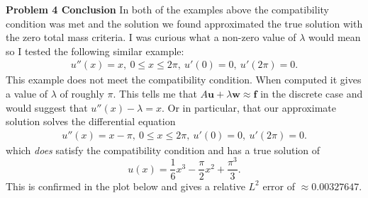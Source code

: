 \documentclass[12pt]{article}
\newcommand{\problem}[1]{\hspace{-4 ex} \large \textbf{Problem #1} }
\renewcommand{\vec}[1]{\boldsymbol{\mathbf{#1}}}
\begin{document}
\bigbreak
\problem{4 Conclusion} In both of the examples above the compatibility condition was met and the solution we found approximated the true solution with the zero total mass criteria. I was curious what a non-zero value of $\lambda$ would mean so I tested the following similar example:
\begin{align}
u''(x) = x, \ 0 \leq x \leq 2\pi, \ u'(0)=0, \ u'(2\pi)=0.
\end{align}
This example does not meet the compatibility condition. When computed it gives a value of $\lambda$ of roughly $\pi$.  This tells me that $A\vec{u} + \lambda \vec{w} \approx \vec{f}$ in the discrete case and would suggest that $u''(x) - \lambda = x$. Or in particular, that our approximate solution solves the differential equation
\begin{align}
u''(x) = x-\pi, \ 0 \leq x \leq 2\pi, \ u'(0)=0, \ u'(2\pi)=0.
\end{align}
which \textit{does} satisfy the compatibility condition and has a true solution of 
$$
u(x) = \frac{1}{6}x^3 - \frac{\pi}{2}x^2 + \frac{\pi^3}{3}.
$$
This is confirmed in the plot below and gives a relative $L^2$ error of $\approx 0.00327647$.

%
%
%
%
\end{document}
